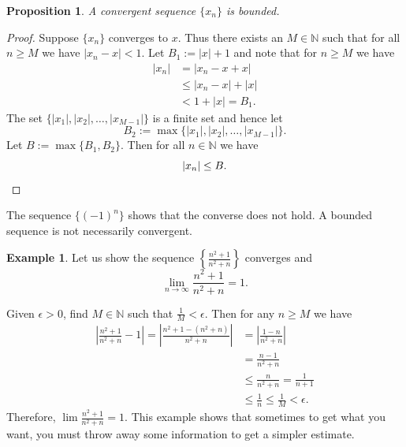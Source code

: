 \documentclass[12pt]{book}
\newcommand{\abs}[1]{\left\lvert {#1} \right\rvert}
\newcommand{\N}{{\mathbb{N}}}
\theoremstyle{plain}
\newtheorem{prop}[thm]{Proposition}
\theoremstyle{remark}
\theoremstyle{definition}
\theoremstyle{exercise}
\theoremstyle{example}
\newtheorem{example}[thm]{Example}
\begin{document}
\begin{prop}
A convergent sequence $\{ x_n \}$ is bounded.
\end{prop}

\begin{proof}
Suppose $\{ x_n \}$ converges to $x$.  Thus there exists an $M \in \N$
such that for all $n \geq M$ we have
$\abs{x_n - x} < 1$.  Let $B_1 := \abs{x}+1$ and note that for $n \geq M$ we
have
\begin{equation*}
\begin{split}
\abs{x_n} & = \abs{x_n - x + x}
\\
& \leq \abs{x_n - x} + \abs{x}
\\
& < 1 + \abs{x} = B_1 .
\end{split}
\end{equation*}
The set $\{ \abs{x_1}, \abs{x_2}, \ldots, \abs{x_{M-1}} \}$
is a finite set and hence let
\begin{equation*}
B_2 := \max \{ \abs{x_1}, \abs{x_2}, \ldots, \abs{x_{M-1}} \} .
\end{equation*}
Let $B := \max \{ B_1, B_2 \}$.  Then for all $n \in \N$ we have
\begin{equation*}
\abs{x_n} \leq B. \qedhere
\end{equation*}
\end{proof}

The sequence $\{ {(-1)}^n \}$ shows that the converse
does not hold.  A bounded sequence is not necessarily convergent.

\begin{example}
Let us show the sequence $\left\{ \frac{n^2+1}{n^2+n} \right\}$ converges and
\begin{equation*}
\lim_{n\to\infty} \frac{n^2+1}{n^2+n} = 1 .
\end{equation*}

Given $\epsilon > 0$,
find $M \in \N$ such that $\frac{1}{M} < \epsilon$.  Then for any $n \geq
M$ we have
\begin{equation*}
\begin{split}
\abs{\frac{n^2+1}{n^2+n} - 1}  =
\abs{\frac{n^2+1 - (n^2+n)}{n^2+n}}
& =
\abs{\frac{1 - n}{n^2+n}} \\
& =
\frac{n-1}{n^2+n} \\
& \leq 
\frac{n}{n^2+n} 
 =
\frac{1}{n+1}  \\
& \leq \frac{1}{n}
\leq \frac{1}{M} < \epsilon .
\end{split}
\end{equation*}
Therefore,
$\lim \frac{n^2+1}{n^2+n} = 1$.
This example shows that sometimes to get what you want, you must throw away
some information to get a simpler estimate.
\end{example}
\end{document}
